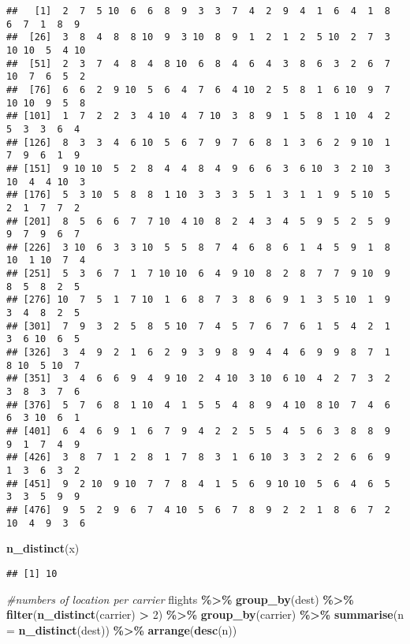 \documentclass[
]{article}
\newenvironment{Shaded}{\begin{snugshade}}{\end{snugshade}}
\newcommand{\AttributeTok}[1]{\textcolor[rgb]{0.13,0.29,0.53}{#1}}
\newcommand{\CommentTok}[1]{\textcolor[rgb]{0.56,0.35,0.01}{\textit{#1}}}
\newcommand{\DecValTok}[1]{\textcolor[rgb]{0.00,0.00,0.81}{#1}}
\newcommand{\FunctionTok}[1]{\textcolor[rgb]{0.13,0.29,0.53}{\textbf{#1}}}
\newcommand{\NormalTok}[1]{#1}
\newcommand{\SpecialCharTok}[1]{\textcolor[rgb]{0.81,0.36,0.00}{\textbf{#1}}}
\begin{document}
\begin{verbatim}
##   [1]  2  7  5 10  6  6  8  9  3  3  7  4  2  9  4  1  6  4  1  8  6  7  1  8  9
##  [26]  3  8  4  8  8 10  9  3 10  8  9  1  2  1  2  5 10  2  7  3 10 10  5  4 10
##  [51]  2  3  7  4  8  4  8 10  6  8  4  6  4  3  8  6  3  2  6  7 10  7  6  5  2
##  [76]  6  6  2  9 10  5  6  4  7  6  4 10  2  5  8  1  6 10  9  7 10 10  9  5  8
## [101]  1  7  2  2  3  4 10  4  7 10  3  8  9  1  5  8  1 10  4  2  5  3  3  6  4
## [126]  8  3  3  4  6 10  5  6  7  9  7  6  8  1  3  6  2  9 10  1  7  9  6  1  9
## [151]  9 10 10  5  2  8  4  4  8  4  9  6  6  3  6 10  3  2 10  3 10  4  4 10  3
## [176]  5  3 10  5  8  8  1 10  3  3  3  5  1  3  1  1  9  5 10  5  2  1  7  7  2
## [201]  8  5  6  6  7  7 10  4 10  8  2  4  3  4  5  9  5  2  5  9  9  7  9  6  7
## [226]  3 10  6  3  3 10  5  5  8  7  4  6  8  6  1  4  5  9  1  8 10  1 10  7  4
## [251]  5  3  6  7  1  7 10 10  6  4  9 10  8  2  8  7  7  9 10  9  8  5  8  2  5
## [276] 10  7  5  1  7 10  1  6  8  7  3  8  6  9  1  3  5 10  1  9  3  4  8  2  5
## [301]  7  9  3  2  5  8  5 10  7  4  5  7  6  7  6  1  5  4  2  1  3  6 10  6  5
## [326]  3  4  9  2  1  6  2  9  3  9  8  9  4  4  6  9  9  8  7  1  8 10  5 10  7
## [351]  3  4  6  6  9  4  9 10  2  4 10  3 10  6 10  4  2  7  3  2  3  8  3  7  6
## [376]  5  7  6  8  1 10  4  1  5  5  4  8  9  4 10  8 10  7  4  6  6  3 10  6  1
## [401]  6  4  6  9  1  6  7  9  4  2  2  5  5  4  5  6  3  8  8  9  9  1  7  4  9
## [426]  3  8  7  1  2  8  1  7  8  3  1  6 10  3  3  2  2  6  6  9  1  3  6  3  2
## [451]  9  2 10  9 10  7  7  8  4  1  5  6  9 10 10  5  6  4  6  5  3  3  5  9  9
## [476]  9  5  2  9  6  7  4 10  5  6  7  8  9  2  2  1  8  6  7  2 10  4  9  3  6
\end{verbatim}

\begin{Shaded}
\begin{Highlighting}[]
\FunctionTok{n\_distinct}\NormalTok{(x)}
\end{Highlighting}
\end{Shaded}

\begin{verbatim}
## [1] 10
\end{verbatim}

\begin{Shaded}
\begin{Highlighting}[]
\CommentTok{\#numbers of location per carrier }
\NormalTok{flights }\SpecialCharTok{\%\textgreater{}\%}
  \FunctionTok{group\_by}\NormalTok{(dest) }\SpecialCharTok{\%\textgreater{}\%}
  \FunctionTok{filter}\NormalTok{(}\FunctionTok{n\_distinct}\NormalTok{(carrier) }\SpecialCharTok{\textgreater{}} \DecValTok{2}\NormalTok{) }\SpecialCharTok{\%\textgreater{}\%}
  \FunctionTok{group\_by}\NormalTok{(carrier) }\SpecialCharTok{\%\textgreater{}\%} 
  \FunctionTok{summarise}\NormalTok{(}\AttributeTok{n =} \FunctionTok{n\_distinct}\NormalTok{(dest)) }\SpecialCharTok{\%\textgreater{}\%}
  \FunctionTok{arrange}\NormalTok{(}\FunctionTok{desc}\NormalTok{(n))}
\end{Highlighting}
\end{Shaded}
\end{document}
